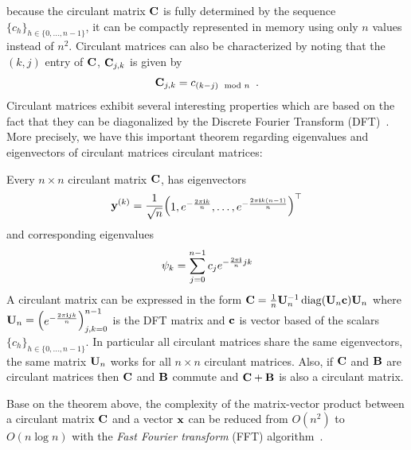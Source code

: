 \noindent
because the circulant matrix $\mathbf{C}$ is fully determined by the sequence $\{c_h\}_{h \in \{0, \dots, n-1\}}$, it can be compactly represented in memory using only $n$ values instead of $n^2$.
Circulant matrices can also be characterized by noting that the $(k,j)$ entry of $\mathbf{C}$, $\mathbf{C}_{j,k}$ is given by
\begin{equation}
  \Cmat_{j,k} = c_{\left(k-j\right) \mod n} \enspace.
\end{equation}
Circulant matrices exhibit several interesting properties which are based on the fact that they can be diagonalized by the Discrete Fourier Transform (DFT)~\cite{davis1979circulant}.
More precisely, we have this important theorem regarding eigenvalues and eigenvectors of circulant matrices circulant matrices:
\begin{theorem}
  Every $n \times n$ circulant matrix $\mathbf{C}$, has eigenvectors  
  \begin{equation}
    \yvec^{(k)} = \frac{1}{\sqrt{n}} \leftmatrix 1, e^{-\frac{2 \pi \ci k}{n}}, \dots, e^{-\frac{2 \pi \ci k(n-1)}{n}} \rightmatrix^\top
  \end{equation}
  and corresponding eigenvalues
  \begin{equation}
    \psi_k = \sum_{j=0}^{n-1} c_j e^{-\frac{2 \pi \mathbf{i}}{n} jk}
  \end{equation}
  A circulant matrix can be expressed in the form $\mathbf{C} = \frac{1}{n} \mathbf{U}_n^{-1} \operatorname*{diag}(\mathbf{U}_n \mathbf{c}) \mathbf{U}_n$ where $\mathbf{U}_n = \begin{pmatrix} e^{-\frac{2 \pi \mathbf{i} jk}{n}} \end{pmatrix}_{j,k = 0}^{n-1}$ is the DFT matrix and $\mathbf{c}$ is vector based of the scalars $\{c_h\}_{h \in \{0, \dots, n-1\}}$.
  In particular all circulant matrices share the same eigenvectors, the same matrix $\mathbf{U}_n$ works for all $n \times n$ circulant matrices.
  Also, if $\mathbf{C}$ and $\mathbf{B}$ are circulant matrices then $\mathbf{C}$ and $\mathbf{B}$ commute and $\mathbf{C} + \mathbf{B}$ is also a circulant matrix.
\end{theorem}

Base on the theorem above, the complexity of the matrix-vector product between a circulant matrix $\mathbf{C}$ and a vector $\mathbf{x}$ can be reduced from $O(n^2)$ to $O(n \log n)$ with the \emph{Fast Fourier transform} (FFT) algorithm~\cite{cooley1965algorithm}.


